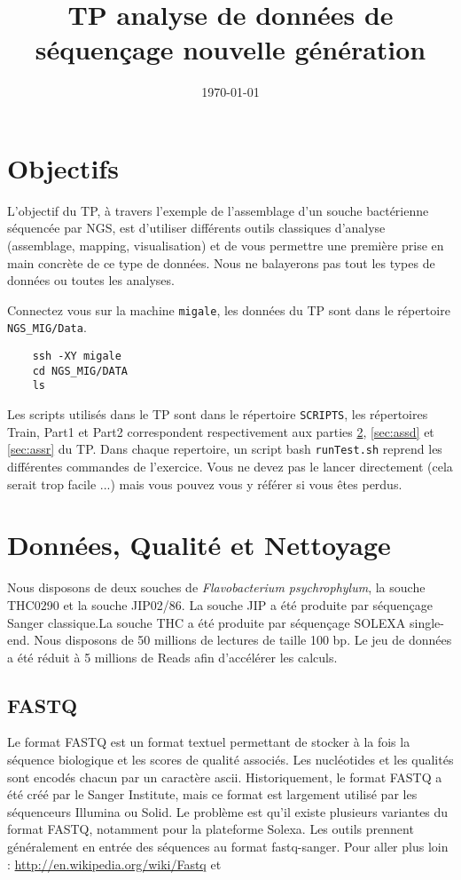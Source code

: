 \documentclass[a4paper,12pt]{article}
\title{TP analyse de données de séquençage nouvelle génération}
\date{\today}
\begin{document}
 

\maketitle 
\section{Objectifs} 
L'objectif du TP, à travers l'exemple de l'assemblage d'un souche bactérienne séquencée par NGS, est d'utiliser différents outils classiques d'analyse (assemblage, mapping, visualisation) et de vous permettre une première prise en main concrète de ce type de données. Nous ne balayerons pas tout les types de données ou toutes les analyses.

Connectez vous sur la machine \verb=migale=, les données du TP sont dans le répertoire \verb=NGS_MIG/Data=.
\begin{lstlisting}
	ssh -XY migale
	cd NGS_MIG/DATA
	ls
\end{lstlisting}



Les scripts utilisés dans le TP sont dans le répertoire \verb=SCRIPTS=, les répertoires Train, Part1 et Part2 correspondent respectivement aux parties \ref{sec:qual}, \ref{sec:assd} et \ref{sec:assr} du TP. Dans chaque repertoire, un script bash \verb=runTest.sh= reprend les différentes commandes de l'exercice. Vous ne devez pas le lancer directement (cela serait trop facile ...) mais vous pouvez vous y référer si vous êtes perdus. 

\section{Données, Qualité et Nettoyage}
\label{sec:qual}
Nous disposons de deux souches de \textit{Flavobacterium psychrophylum}, la souche THC0290 et la souche JIP02/86. La souche JIP a été produite par séquençage Sanger classique.La souche THC a été produite par séquençage SOLEXA single-end. Nous disposons de 50 millions de lectures de taille 100 bp. Le jeu de données a été réduit à 5 millions de Reads afin d'accélérer les calculs.

\subsection{FASTQ}
\label{sec:fastq}
Le format FASTQ est un format textuel permettant de stocker à la fois la séquence biologique et les scores de qualité associés. Les nucléotides et les qualités sont encodés chacun par un caractère ascii. Historiquement, le format FASTQ a été créé par le Sanger Institute, mais ce format est largement utilisé par les séquenceurs Illumina ou Solid. Le problème est qu'il existe plusieurs variantes du format FASTQ, notamment pour la plateforme Solexa. Les outils prennent généralement en entrée des séquences au format fastq-sanger.
Pour aller plus loin : \url{http://en.wikipedia.org/wiki/Fastq} et \cite{Cock} 
\end{document}

